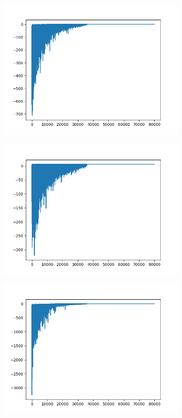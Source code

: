 \begin{figure}[H]
	\begin{subfigure}{.25\textwidth}
		\includegraphics[width=\textwidth]{img/train/matrice_12-11_36_20.png}
	\end{subfigure}%
	\begin{subfigure}{.25\textwidth}
		\includegraphics[width=\textwidth]{img/train/matrice_13-11_36_56.png}
	\end{subfigure}%
	\begin{subfigure}{.25\textwidth}
		\includegraphics[width=\textwidth]{img/train/matrice_14-11_39_06.png}

\end{subfigure}
\end{figure}
